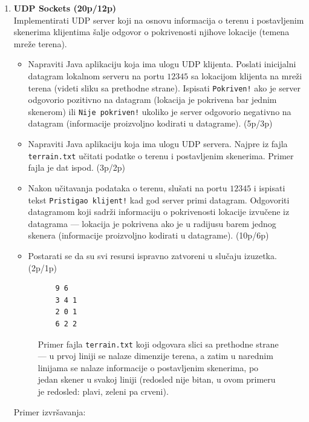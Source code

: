 \documentclass[]{article}
\begin{document}
\begin{enumerate}
\item \textbf{UDP Sockets (20p/12p)}
\\Implementirati UDP server koji na osnovu informacija o terenu i postavljenim skenerima klijentima \v{s}alje odgovor o pokrivenosti njihove lokacije (temena mre\v{z}e terena). 
\begin{itemize}
  \item Napraviti Java aplikaciju koja ima ulogu UDP klijenta. Poslati inicijalni datagram lokalnom serveru na portu $12345$ sa lokacijom klijenta na mre\v{z}i terena (videti sliku sa prethodne strane). Ispisati \texttt{Pokriven!} ako je server odgovorio pozitivno na datagram (lokacija je pokrivena bar jednim skenerom) ili \texttt{Nije pokriven!} ukoliko je server odgovorio negativno na datagram (informacije proizvoljno kodirati u datagrame). \hfill (5p/3p)
  \item Napraviti Java aplikaciju koja ima ulogu UDP servera. Najpre iz fajla \texttt{terrain.txt} u\v{c}itati podatke o terenu i postavljenim skenerima. Primer fajla je dat ispod. \hfill (3p/2p)
  \item Nakon u\v{c}itavanja podataka o terenu, slu\v{s}ati na portu $12345$ i ispisati tekst \texttt{Pristigao klijent!} kad god server primi datagram. Odgovoriti datagramom koji sadr\v{z}i informaciju o pokrivenosti lokacije izvu\v{c}ene iz datagrama --- lokacija je pokrivena ako je u radijusu barem jednog skenera (informacije proizvoljno kodirati u datagrame). \hfill (10p/6p)
  \item Postarati se da su svi resursi ispravno zatvoreni u slu\v{c}aju izuzetka. \hfill (2p/1p)
\end{itemize}

\vspace{10pt}

\begin{figure}[h!]
  \noindent
  \begin{lstlisting}
    9 6
    3 4 1
    2 0 1
    6 2 2
  \end{lstlisting}
  \caption{Primer fajla \texttt{terrain.txt} koji odgovara slici sa prethodne strane --- u prvoj liniji se nalaze dimenzije terena, a zatim u narednim linijama se nalaze informacije o postavljenim skenerima, po jedan skener u svakoj liniji (redosled nije bitan, u ovom primeru je redosled: plavi, zeleni pa crveni).}
\end{figure}

\vspace{15pt}
Primer izvr\v{s}avanja:


\end{enumerate}
\end{document}
